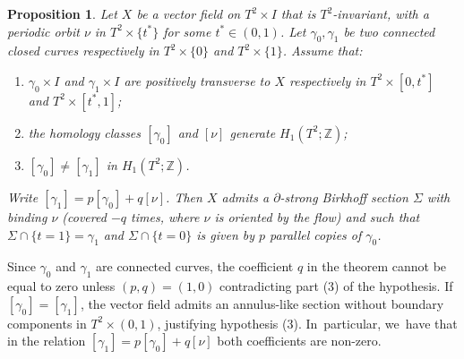 \documentclass[JEP,XML,SOM,Unicode,NoEqCountersInSection,NoFloatCountersInSection,published]{cedram}
\newtheorem{prop}[theorem]{Proposition}
\theoremstyle{definition}
\begin{document}
\begin{prop}\label{prop:helix}
Let $X$ be a vector field on $T^2\times I$ that is $T^2$-invariant, with a periodic orbit $\nu$ in $T^2\times \{t^*\}$ for some $t^*\in(0,1)$. Let $\gamma_0,\gamma_1$ be two connected closed curves respectively in $T^2 \times \{0\}$ and $T^2\times \{1\}$. Assume that:
\begin{enumerate}
\item $\gamma_0\times I$ and $\gamma_1\times I$ are positively transverse to $X$ respectively in $T^2\times [0,t^*]$ and $T^2 \times [t^*,1]$;
\item the homology classes $[\gamma_0]$ and $[\nu]$ generate $H_1(T^2;\mathbb{Z})$;
\item $[\gamma_0]\neq [\gamma_1]$ in $H_1(T^2;\mathbb{Z})$.
\end{enumerate}
Write $[\gamma_1]= p [\gamma_0] + q [\nu]$. Then $X$ admits a $\partial$-strong Birkhoff section $\Sigma$ with binding $\nu$ (covered $-q$ times, where $\nu$ is oriented by the flow) and such that $\Sigma\cap \{t=1\}=\gamma_1$ and $\Sigma \cap \{t=0\}$ is given by $p$ parallel copies of $\gamma_0$.
\end{prop}

{Since $\gamma_0$ and $\gamma_1$ are connected curves, the coefficient $q$ in the theorem cannot be equal to zero unless $(p,q)=(1,0)$ contradicting part (3) of the hypothesis.} If $[\gamma_0]=[\gamma_1]$, the vector field admits an annulus-like section without boundary components in $T^2\times (0,1)$, justifying hypothesis (3). In~particular, we~have that in the relation $[\gamma_1]= p [\gamma_0] + q [\nu]$ both coefficients are non-zero.
\end{document}
